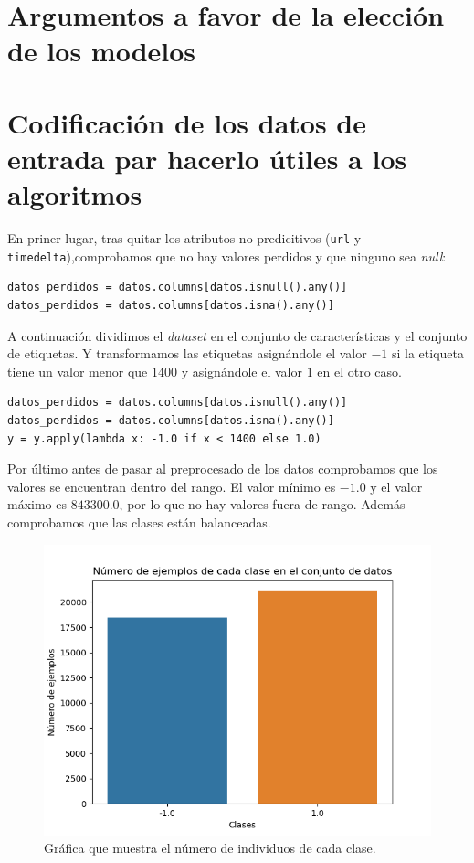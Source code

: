 \documentclass[size=a4, parskip=half, titlepage=false, toc=flat, toc=bib, 12pt]{scrartcl}
\begin{document}
\section{Argumentos a favor de la elección de los modelos}

\section{Codificación de los datos de entrada par hacerlo útiles a los algoritmos}
En priner lugar, tras quitar los atributos no predicitivos (\verb|url| y \verb|timedelta|),comprobamos que no hay valores perdidos y que ninguno sea \textit{null}:
\begin{verbatim}
datos_perdidos = datos.columns[datos.isnull().any()]
datos_perdidos = datos.columns[datos.isna().any()]
\end{verbatim}
A continuación dividimos el \textit{dataset} en el conjunto de características y el conjunto de etiquetas. Y transformamos las etiquetas asignándole el valor $-1$ si la etiqueta tiene un valor menor que $1400$ y asignándole el valor $1$ en el otro caso.
\begin{verbatim}
datos_perdidos = datos.columns[datos.isnull().any()]
datos_perdidos = datos.columns[datos.isna().any()]
y = y.apply(lambda x: -1.0 if x < 1400 else 1.0)
\end{verbatim}

Por último antes de pasar al preprocesado de los datos comprobamos que los valores se encuentran dentro del rango. El valor mínimo es $-1.0$ y el valor máximo es $843300.0$, por lo que no hay valores fuera de rango. Además comprobamos que las clases están balanceadas.
\begin{figure}[H]
\centering
\includegraphics[width=1\textwidth]{./img/balanceadas}
\caption{Gráfica que muestra el número de individuos de cada clase.}
\end{figure}
\end{document}
